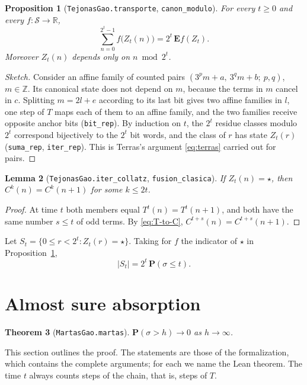\documentclass[11pt]{amsart}
\newtheorem{theorem}{Theorem}[section]
\newtheorem{lemma}[theorem]{Lemma}
\newtheorem{proposition}[theorem]{Proposition}
\theoremstyle{definition}
\theoremstyle{remark}
\newcommand{\Z}{\mathbb{Z}}
\newcommand{\R}{\mathbb{R}}
\newcommand{\Prob}{\mathbf{P}}
\newcommand{\E}{\mathbf{E}}
\newcommand{\fus}{\star}
\newcommand{\lean}[1]{\nolinkurl{#1}}
\begin{document}
\begin{proposition}[\lean{TejonasGao.transporte}, \lean{canon_modulo}]\label{prop:transport}
For every $t\ge0$ and every $f\colon\mathcal S\to\R$,
\[
\sum_{n=0}^{2^t-1} f\bigl(Z_t(n)\bigr)=2^t\,\E f(Z_t).
\]
Moreover $Z_t(n)$ depends only on $n \bmod 2^t$.
\end{proposition}

\begin{proof}[Sketch]
Consider an affine family of counted pairs $(3^{p}m+a,\ 3^{q}m+b;\ p,q)$, $m\in\Z$. Its canonical state does not depend on $m$, because the terms in $m$ cancel in $c$. Splitting $m=2l+e$ according to its last bit gives two affine families in $l$, one step of $T$ maps each of them to an affine family, and the two families receive opposite anchor bits (\lean{bit_rep}). By induction on $t$, the $2^t$ residue classes modulo $2^t$ correspond bijectively to the $2^t$ bit words, and the class of $r$ has state $Z_t(r)$ (\lean{suma_rep}, \lean{iter_rep}). This is Terras's argument \eqref{eq:terras} carried out for pairs.
\end{proof}

\begin{lemma}[\lean{TejonasGao.iter_collatz}, \lean{fusion_clasica}]\label{lem:classical}
If $Z_t(n)=\fus$, then $C^{k}(n)=C^{k}(n+1)$ for some $k\le 2t$.
\end{lemma}

\begin{proof}
At time $t$ both members equal $T^t(n)=T^t(n+1)$, and both have the same number $s\le t$ of odd terms. By \eqref{eq:T-to-C}, $C^{t+s}(n)=C^{t+s}(n+1)$.
\end{proof}

Let $S_t=\{0\le r<2^t: Z_t(r)=\fus\}$. Taking for $f$ the indicator of $\fus$ in Proposition~\ref{prop:transport},
\begin{equation}\label{eq:St}
|S_t|=2^t\,\Prob(\sigma\le t).
\end{equation}

\section{Almost sure absorption}\label{sec:absorption}

\begin{theorem}[\lean{MartasGao.martas}]\label{thm:martas}
$\Prob(\sigma>h)\to0$ as $h\to\infty$.
\end{theorem}

This section outlines the proof. The statements are those of the formalization, which contains the complete arguments; for each we name the Lean theorem. The time $t$ always counts steps of the chain, that is, steps of $T$.
\end{document}
